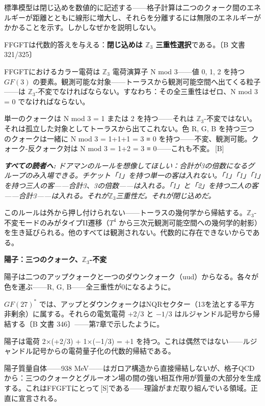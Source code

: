 \documentclass[11pt,openany]{book}
\newcommand{\status}[1]{\penalty10000\,{\tiny\textcolor{gray!70}{[#1]}}}
\newenvironment{laierspur}{%
  \par\vspace{4pt}%
  \noindent\small\itshape\color{blue!60!black}%
  \textbf{すべての読者へ:}\enspace\ignorespaces}{%
  \par\vspace{4pt}\normalsize\normalfont\normalcolor}
\begin{document}
標準模型は閉じ込めを数値的に記述する——格子計算は二つのクォーク間のエネルギーが距離とともに線形に増大し、それらを分離するには無限のエネルギーがかかることを示す。しかしなぜかを説明しない。

FFGFTは代数的答えを与える：\textbf{閉じ込めは $\mathbb{Z}_3$ 三重性選択}である。〔B 文書 321/325〕

FFGFTにおけるカラー電荷は $\mathbb{Z}_3$ 電荷演算子 N mod 3——値 {0, 1, 2} を持つ $GF(3)$ の要素。観測可能な対象——トーラスから観測可能空間へ出てくる粒子——は $\mathbb{Z}_3$-不変でなければならない。すなわち：その全三重性はゼロ、N mod 3 = 0 でなければならない。

単一のクォークは N mod 3 = 1 または 2 を持つ——それは $\mathbb{Z}_3$-不変ではない。それは孤立した対象としてトーラスから出てこれない。色 {R, G, B} を持つ三つのクォークは一緒に N mod 3 = 1+1+1 = 3 ≡ 0 を持つ——不変、観測可能。クォーク-反クォーク対は N mod 3 = 1+2 = 3 ≡ 0——これも不変。\status{B}

\begin{laierspur}
ドアマンのルールを想像してほしい：合計が3の倍数になるグループのみ入場できる。チケット「1」を持つ単一の客は入れない。「1」「1」「1」を持つ三人の客——合計3、3の倍数——は入れる。「1」と「2」を持つ二人の客——合計3——は入れる。それが$\mathbb{Z}_3$三重性だ。それが閉じ込めだ。
\end{laierspur}

このルールは外から押し付けられない——トーラスの幾何学から帰結する。$\mathbb{Z}_3$-不変モードのみがタイプII遷移（$T^4$ から三次元観測可能空間への幾何学的射影）を生き延びられる。他のすべては観測されない。代数的に存在できないからである。

\textbf{陽子：三つのクォーク、$\mathbb{Z}_3$-不変}

陽子は二つのアップクォークと一つのダウンクォーク（uud）からなる。各々が色を運ぶ——{R, G, B}——全三重性が0になるように。

$GF(27)^*$ では、アップとダウンクォークはNQRセクター（13を法とする平方非剰余）に属する。それらの電気電荷 +2/3 と $-1/3$ はルジャンドル記号から帰結する〔B 文書 346〕——第7章で示したように。

陽子は電荷 2×(+2/3) + 1×($-$1/3) = +1 を持つ。これは偶然ではない——ルジャンドル記号からの電荷量子化の代数的帰結である。

陽子質量自体——938 MeV——はガロア構造から直接帰結しないが、格子QCDから：三つのクォークとグルーオン場の間の強い相互作用が質量の大部分を生成する。これはFFGFTにとって\status{S}である——理論がまだ取り組んでいる領域。正直に宣言される。
\end{document}
